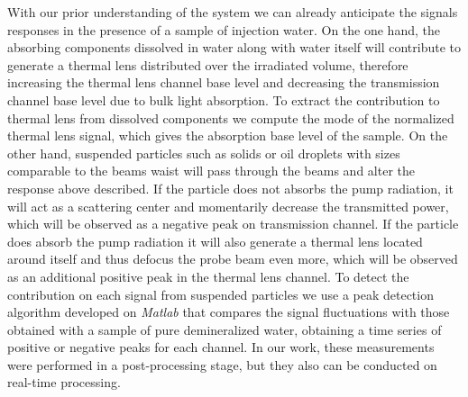 \documentclass[10pt,authoryear,twocolumn]{article}
\begin{document}
With our prior understanding of the system we can already anticipate the signals responses in the presence of a sample of injection water. On the one hand, the absorbing components dissolved in water along with water itself will contribute to generate a thermal lens distributed over the irradiated volume, therefore increasing the thermal lens channel base level and decreasing the transmission channel base level due to bulk light absorption. To extract the contribution to thermal lens from dissolved components we compute the mode of the normalized thermal lens signal, which gives the absorption base level of the sample. On the other hand, suspended particles such as solids or oil droplets with sizes comparable to the beams waist will pass through the beams and alter the response above described. If the particle does not absorbs the pump radiation, it will act as a scattering center and momentarily decrease the transmitted power, which will be observed as a negative peak on transmission channel. If the particle does absorb the pump radiation it will also generate a thermal lens located around itself and thus defocus the probe beam even more, which will be observed as an additional positive peak in the thermal lens channel. To detect the contribution on each signal from suspended particles we use a peak detection algorithm developed on \emph{Matlab} that compares the signal fluctuations with those obtained with a sample of pure demineralized water, obtaining a time series of positive or negative peaks for each channel. In our work, these measurements were performed in a post-processing stage, but they also can be conducted on real-time processing.
\end{document}
